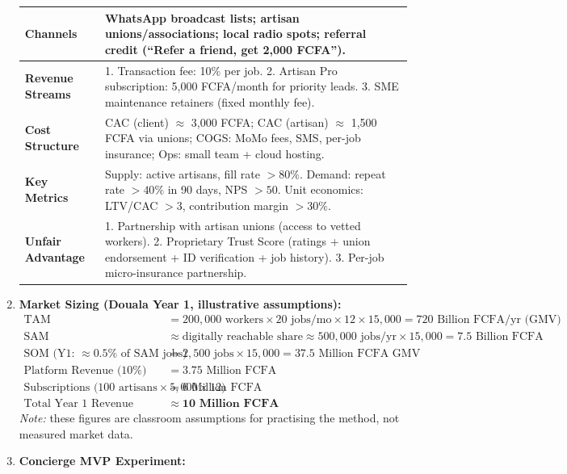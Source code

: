 \documentclass[11pt]{article}
\begin{document}
\begin{exoresolu}
\begin{enumerate}
\begin{center}
\begin{tabularx}{\linewidth}{|l|X|}
    \textbf{Channels} & WhatsApp broadcast lists; artisan unions/associations; local radio spots; referral credit (``Refer a friend, get 2,000 FCFA''). \\ \hline
    \textbf{Revenue Streams} & 1. Transaction fee: 10\% per job. 2. Artisan Pro subscription: 5,000 FCFA/month for priority leads. 3. SME maintenance retainers (fixed monthly fee). \\ \hline
    \textbf{Cost Structure} & CAC (client) $\approx$ 3,000 FCFA; CAC (artisan) $\approx$ 1,500 FCFA via unions; COGS: MoMo fees, SMS, per-job insurance; Ops: small team + cloud hosting. \\ \hline
    \textbf{Key Metrics} & Supply: active artisans, fill rate $>80\%$. Demand: repeat rate $>40\%$ in 90 days, NPS $>50$. Unit economics: LTV/CAC $>3$, contribution margin $>30\%$. \\ \hline
    \textbf{Unfair Advantage} & 1. Partnership with artisan unions (access to vetted workers). 2. Proprietary Trust Score (ratings + union endorsement + ID verification + job history). 3. Per-job micro-insurance partnership. \\ \hline
    \end{tabularx}
    \end{center}
    \item \textbf{Market Sizing (Douala Year 1, illustrative assumptions):}
    \begin{align*}
    \text{TAM} &= 200,000 \text{ workers} \times 20 \text{ jobs/mo} \times 12 \times 15,000 = 720 \text{ Billion FCFA/yr (GMV)} \\
    \text{SAM} &\approx \text{digitally reachable share} \approx 500,000 \text{ jobs/yr} \times 15,000 = 7.5 \text{ Billion FCFA} \\
    \text{SOM (Y1: } \approx 0.5\% \text{ of SAM jobs)} &= 2,500 \text{ jobs} \times 15,000 = 37.5 \text{ Million FCFA GMV} \\
    \text{Platform Revenue (10\%)} &= 3.75 \text{ Million FCFA} \\
    \text{Subscriptions (100 artisans} \times 5,000 \times 12) &= 6 \text{ Million FCFA} \\
    \text{Total Year 1 Revenue} &\approx \mathbf{10 \text{ Million FCFA}}
    \end{align*}
    \emph{Note:} these figures are classroom assumptions for practising the method, not measured market data.
    \item \textbf{Concierge MVP Experiment:}
    \begin{itemize}

\end{itemize}
\end{enumerate}
\end{exoresolu}
\end{document}
